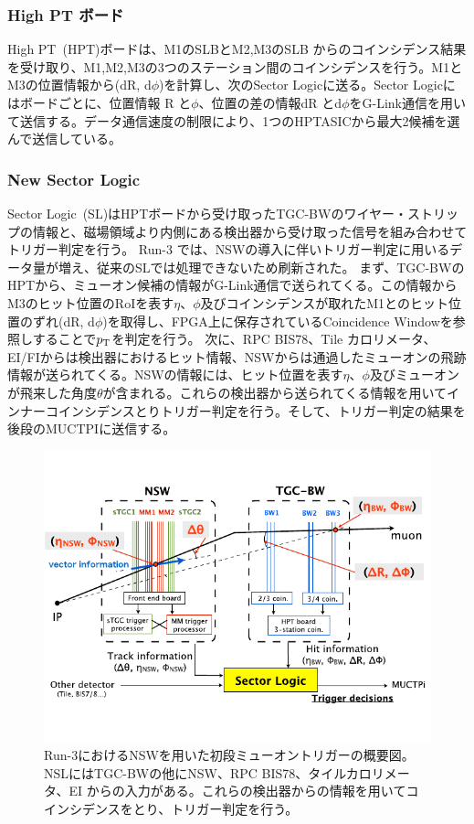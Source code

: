 \subsubsection{High PT ボード}
High PT~(HPT)ボードは、M1のSLBとM2,M3のSLB からのコインシデンス結果を受け取り、M1,M2,M3の3つのステーション間のコインシデンスを行う。M1とM3の位置情報から(dR, d$\phi$)を計算し、次のSector Logicに送る。Sector Logicにはボードごとに、位置情報 R と$\phi$、位置の差の情報dR とd$\phi$をG-Link通信を用いて送信する。データ通信速度の制限により、1つのHPTASICから最大2候補を選んで送信している。

\subsubsection{New Sector Logic}
Sector Logic~(SL)はHPTボードから受け取ったTGC-BWのワイヤー・ストリップの情報と、磁場領域より内側にある検出器から受け取った信号を組み合わせてトリガー判定を行う。
Run-3 では、NSWの導入に伴いトリガー判定に用いるデータ量が増え、従来のSLでは処理できないため刷新された。
まず、TGC-BWのHPTから、ミューオン候補の情報がG-Link通信で送られてくる。この情報からM3のヒット位置のRoIを表す$\eta$、$\phi$及びコインシデンスが取れたM1とのヒット位置のずれ(dR, d$\phi$)を取得し、FPGA上に保存されているCoincidence Windowを参照しすることで$p_{\rm{T}}$を判定を行う。
次に、RPC BIS78、Tile カロリメータ、EI/FIからは検出器におけるヒット情報、NSWからは通過したミューオンの飛跡情報が送られてくる。NSWの情報には、ヒット位置を表す$\eta$、$\phi$及びミューオンが飛来した角度$\theta$が含まれる。これらの検出器から送られてくる情報を用いてインナーコインシデンスとりトリガー判定を行う。そして、トリガー判定の結果を後段のMUCTPIに送信する。

\begin{figure}[tb]
  \centering
  \includegraphics[clip, width=14cm]{fig/2/NSW_innercoin.pdf}
  \caption{Run-3におけるNSWを用いた初段ミューオントリガーの概要図\cite{article:phase1}。NSLにはTGC-BWの他にNSW、RPC BIS78、タイルカロリメータ、EI からの入力がある。これらの検出器からの情報を用いてコインシデンスをとり、トリガー判定を行う。}
  \label{fig:NSW_inner}
\end{figure}


